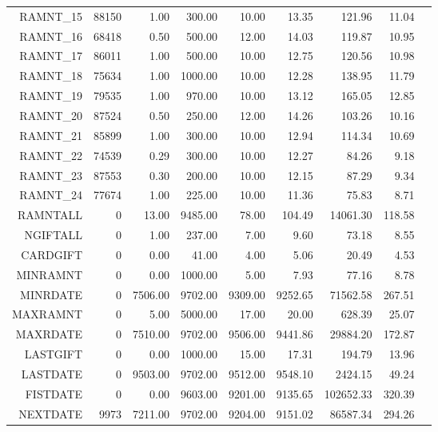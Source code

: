 \begin{longtable}{|rrrrrrrrr|}
	RAMNT\_15  &  88150  &  1.00  &  300.00  &  10.00  &  13.35  &  121.96  &  11.04 & \\
	RAMNT\_16  &  68418  &  0.50  &  500.00  &  12.00  &  14.03  &  119.87  &  10.95 & \\
	RAMNT\_17  &  86011  &  1.00  &  500.00  &  10.00  &  12.75  &  120.56  &  10.98 & \\
	RAMNT\_18  &  75634  &  1.00  &  1000.00  &  10.00  &  12.28  &  138.95  &  11.79 & \\
	RAMNT\_19  &  79535  &  1.00  &  970.00  &  10.00  &  13.12  &  165.05  &  12.85 & \\
	RAMNT\_20  &  87524  &  0.50  &  250.00  &  12.00  &  14.26  &  103.26  &  10.16 & \\
	RAMNT\_21  &  85899  &  1.00  &  300.00  &  10.00  &  12.94  &  114.34  &  10.69 & \\
	RAMNT\_22  &  74539  &  0.29  &  300.00  &  10.00  &  12.27  &  84.26  &  9.18 & \\
	RAMNT\_23  &  87553  &  0.30  &  200.00  &  10.00  &  12.15  &  87.29  &  9.34 & \\
	RAMNT\_24  &  77674  &  1.00  &  225.00  &  10.00  &  11.36  &  75.83  &  8.71 & \\
	RAMNTALL  &  0  &  13.00  &  9485.00  &  78.00  &  104.49  &  14061.30  &  118.58 & \\
	NGIFTALL  &  0  &  1.00  &  237.00  &  7.00  &  9.60  &  73.18  &  8.55 & \\
	CARDGIFT  &  0  &  0.00  &  41.00  &  4.00  &  5.06  &  20.49  &  4.53 & \\
	MINRAMNT  &  0  &  0.00  &  1000.00  &  5.00  &  7.93  &  77.16  &  8.78 & \\
	MINRDATE  &  0  &  7506.00  &  9702.00  &  9309.00  &  9252.65  &  71562.58  &  267.51 & \\
	MAXRAMNT  &  0  &  5.00  &  5000.00  &  17.00  &  20.00  &  628.39  &  25.07 & \\
	MAXRDATE  &  0  &  7510.00  &  9702.00  &  9506.00  &  9441.86  &  29884.20  &  172.87 & \\
	LASTGIFT  &  0  &  0.00  &  1000.00  &  15.00  &  17.31  &  194.79  &  13.96 & \\
	LASTDATE  &  0  &  9503.00  &  9702.00  &  9512.00  &  9548.10  &  2424.15  &  49.24 & \\
	FISTDATE  &  0  &  0.00  &  9603.00  &  9201.00  &  9135.65  &  102652.33  &  320.39 & \\
	NEXTDATE  &  9973  &  7211.00  &  9702.00  &  9204.00  &  9151.02  &  86587.34  &  294.26 & \\

\end{longtable}
